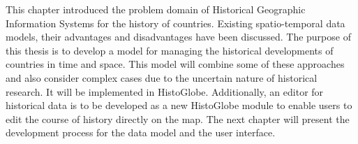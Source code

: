 \vspace{2.0em}

This chapter introduced the problem domain of Historical Geographic Information Systems for the history of countries. Existing spatio-temporal data models, their advantages and disadvantages have been discussed. The purpose of this thesis is to develop a model for managing the historical developments of countries in time and space. This model will combine some of these approaches and also consider complex cases due to the uncertain nature of historical research. It will be implemented in HistoGlobe. Additionally, an editor for historical data is to be developed as a new HistoGlobe module to enable users to edit the course of history directly on the map. The next chapter will present the development process for the data model and the user interface.

